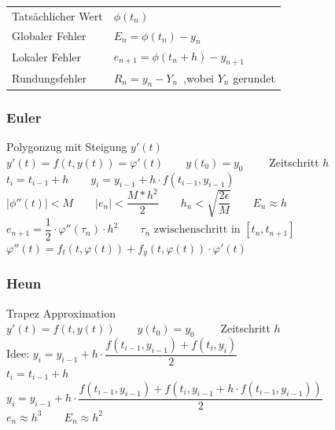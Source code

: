 \begin{tabular}{ll}
Tatsächlicher Wert \quad  & $\phi(t_n)$ \\
Globaler Fehler & $E_n = \phi(t_n) - y_n$ \\
Lokaler Fehler & $e_{n+1} = \phi(t_n + h) - y_{n+1}$ \\
Rundungsfehler & $R_n = y_n - Y_n$\, ,\quad wobei $Y_n$ gerundet \\
\end{tabular}

\newpage
\begin{minipage}{0.6\linewidth}
    \subsubsection{Euler}
    Polygonzug mit Steigung $y'(t)$\\
    $y'(t)=f(t,y(t)) = \varphi'(t) \qquad y(t_0)=y_0 \qquad$ Zeitschritt $h$\\
    $t_i = t_{i-1} + h \qquad y_i=y_{i-1} + h \cdot f(t_{i-1},y_{i-1})$\\
    
    $|\phi''(t)|<M \qquad |e_n| < \dfrac{M*h^2}{2} \qquad
    h_n < \sqrt{\dfrac{2\epsilon}{M}} \qquad E_n \approx h$\\
    $e_{n+1} = \dfrac{1}{2} \cdot \varphi''(\tau_n)\cdot h^2 \qquad \tau_n \text{ zwischenschritt in } [t_n,t_{n+1}]$\\
    $\varphi''(t)=f_t(t,\varphi(t)) + f_y(t,\varphi(t))\cdot\varphi'(t)$
\end{minipage}
\begin{minipage}{0.4\linewidth}
    \centering
    
\end{minipage} 
\vspace{0.5cm}

\begin{minipage}{0.6\linewidth}
    \subsubsection{Heun}
    Trapez Approximation \\
    $y'(t)=f(t,y(t)) \qquad y(t_0)=y_0 \qquad$ Zeitschritt $h$\\
    Idee: \quad $y_i=y_{i-1} + h \cdot \dfrac{f(t_{i-1},y_{i-1}) + f(t_{i},y_{i})}{2}$\\
    $t_i = t_{i-1} + h$ \\ 
    $y_i = y_{i-1} + h \cdot \dfrac{f(t_{i-1},y_{i-1}) + f(t_{i},y_{i-1} + h \cdot f(t_{i-1},y_{i-1}))}{2}$\\
    $e_n \approx h^3 \qquad E_n \approx h^2$
\end{minipage}
\begin{minipage}{0.4\linewidth}
    \centering
    
\end{minipage}
\vspace{0.5cm}


